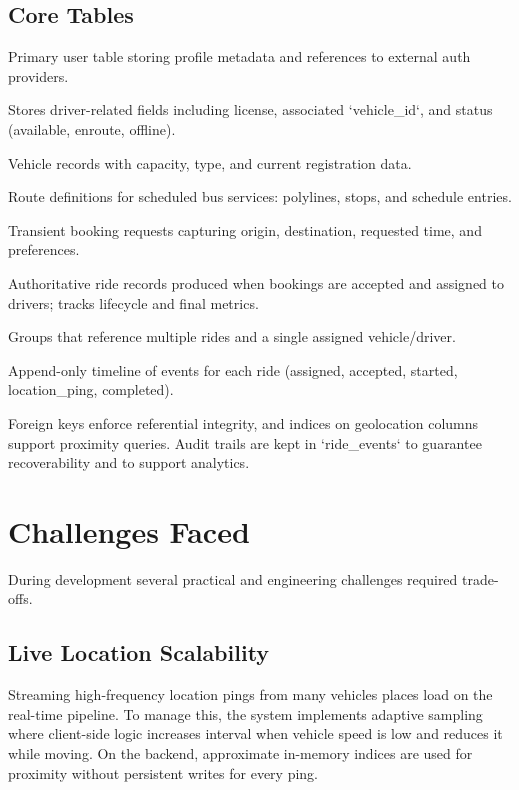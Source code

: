 \documentclass[12pt,a4paper]{article}
\begin{document}
\subsection{Core Tables}
\begin{description}[leftmargin=*]
  \item[users] Primary user table storing profile metadata and references to external auth providers.
  \item[drivers] Stores driver-related fields including license, associated `vehicle_id`, and status (available, enroute, offline).
  \item[vehicles] Vehicle records with capacity, type, and current registration data.
  \item[routes] Route definitions for scheduled bus services: polylines, stops, and schedule entries.
  \item[ride_requests] Transient booking requests capturing origin, destination, requested time, and preferences.
  \item[rides] Authoritative ride records produced when bookings are accepted and assigned to drivers; tracks lifecycle and final metrics.
  \item[shared_ride_groups] Groups that reference multiple rides and a single assigned vehicle/driver.
  \item[ride_events] Append-only timeline of events for each ride (assigned, accepted, started, location_ping, completed).
\end{description}

Foreign keys enforce referential integrity, and indices on geolocation columns support proximity queries. Audit trails are kept in `ride_events` to guarantee recoverability and to support analytics.

\section{Challenges Faced}
During development several practical and engineering challenges required trade-offs.

\subsection{Live Location Scalability}
Streaming high-frequency location pings from many vehicles places load on the real-time pipeline. To manage this, the system implements adaptive sampling where client-side logic increases interval when vehicle speed is low and reduces it while moving. On the backend, approximate in-memory indices are used for proximity without persistent writes for every ping.
\end{document}
